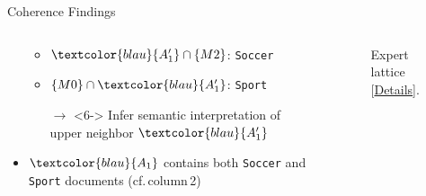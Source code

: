 \begin{frame}{Coherence Findings}
\begin{columns}[T,onlytextwidth]
\begin{column}{0.65\textwidth}
\begin{itemize}
\begin{itemize}
        \item<5-> $\textcolor{blau}{A_1'} \cap \{M2\}$:
                \texttt{Soccer}
        \item<5-> $\{M0\} \cap \textcolor{blau}{A_1'}$:
                \texttt{Sport}
        \item[$\rightarrow$]<6-> Infer semantic interpretation of upper neighbor $\textcolor{blau}{A_1'}$  
    \end{itemize}
    \vspace{-0.5em}
    \item<7-> $\textcolor{blau}{A_1}$ contains both \texttt{Soccer} and \texttt{Sport} documents (cf.\,column\,2)
\end{itemize}


\end{column}

\begin{column}{0.35\textwidth}
\begin{figure}
\centering
{}%
%
\caption{Expert lattice {\tiny[\hyperlink{appendix:expert-lattice-detail}{Details}]}.}
\end{figure}
\end{column}
\end{columns}
\end{frame}
















